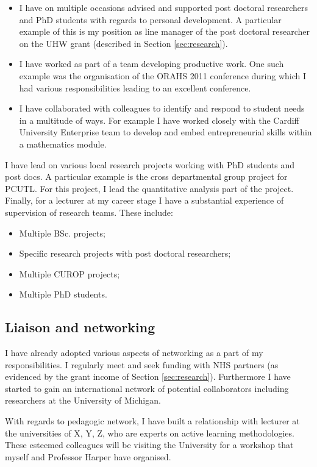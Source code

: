 \documentclass{article}
\begin{document}
\begin{itemize}
    \item I have on multiple occasions advised and supported post doctoral researchers and PhD students with regards to personal development.
    A particular example of this is my position as line manager of the post doctoral researcher on the UHW grant (described in Section \ref{sec:research}).
    \item I have worked as part of a team developing productive work. One such example was the organisation of the ORAHS 2011 conference during which I had various responsibilities leading to an excellent conference.
    \item I have collaborated with colleagues to identify and respond to student needs in a multitude of ways.
    For example I have worked closely with the Cardiff University Enterprise team to develop and embed entrepreneurial skills within a mathematics module.
\end{itemize}

I have lead on various local research projects working with PhD students and post docs.
A particular example is the cross departmental group project for PCUTL.
For this project, I lead the quantitative analysis part of the project.
Finally, for a lecturer at my career stage I have a substantial experience of supervision of research teams.
These include:

\begin{itemize}
    \item Multiple BSc. projects;
    \item Specific research projects with post doctoral researchers;
    \item Multiple CUROP projects;
    \item Multiple PhD students.
\end{itemize}

\subsection{Liaison and networking}

I have already adopted various aspects of networking as a part of my responsibilities.
I regularly meet and seek funding with NHS partners (as evidenced by the grant income of Section \ref{sec:research}).
Furthermore I have started to gain an international network of potential collaborators including researchers at the University of Michigan.

With regards to pedagogic network, I have built a relationship with lecturer at the universities of X, Y, Z, who are experts on active learning methodologies.
These esteemed colleagues will be visiting the University for a workshop that myself and Professor Harper have organised.
\end{document}
